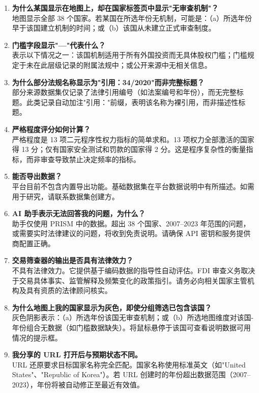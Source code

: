 \documentclass[12pt,a4paper]{article}
\begin{document}
\begin{enumerate}[label=\textbf{问\arabic*.}]

\item \textbf{为什么某国显示在地图上，却在国家标签页中显示"无审查机制"？}\\
地图显示全部 38 个国家。若某国在所选年份无机制，可能是：（a）所选年份早于该国建立机制的时间；或（b）该国从未建立正式审查制度。

\item \textbf{门槛字段显示"—"代表什么？}\\
表示以下情况之一：该国机制适用于所有外国投资而无具体股权门槛；门槛规定于未在此层级记录的附属法规中；或公开来源中无相关信息。

\item \textbf{为什么部分法规名称显示为"引用：34/2020"而非完整标题？}\\
部分来源数据集仅记录了法律引用编号（如法案编号和年份），而无完整标题。此类记录自动加注"引用："前缀，表明该名称为裸引用，而非描述性标题。

\item \textbf{严格程度评分如何计算？}\\
严格程度是 13 项二元程序性权力指标的简单求和。13 项权力全部激活的国家得 13 分；仅有国家安全测试和罚款的国家得 2 分。这是程序复杂性的衡量指标，而非审查导致禁止决定频率的指标。

\item \textbf{能否导出数据？}\\
平台目前不包含内置导出功能。基础数据集在平台数据说明中有所描述。如需用于研究，请联系数据集创建方。

\item \textbf{AI 助手表示无法回答我的问题，为什么？}\\
助手仅使用 PRISM 中的数据。超出 38 个国家、2007--2023 年范围的问题，或需要实时法律建议的问题，将收到免责说明。请确保 API 密钥和服务提供商配置正确。

\item \textbf{交易筛查器的输出是否具有法律效力？}\\
不具有法律效力。它提供基于编码数据的指导性自动评估。FDI 审查义务取决于交易具体事实、监管解释及频繁变化的政策指引。请务必向相关国家主管机构及具有资质的法律顾问核实。

\item \textbf{为什么地图上我的国家显示为灰色，即使分组筛选已包含该国？}\\
灰色阴影表示：（a）所选年份该国无审查机制；或（b）所选地图维度对该国-年份组合无数据（如门槛数据缺失）。将鼠标悬停于该国可查看说明数据可用情况的提示框。

\item \textbf{我分享的 URL 打开后与预期状态不同。}\\
URL 还原要求目标国家名称完全匹配。国家名称使用标准英文（如"United States"、"Republic of Korea"）。若 URL 创建时的年份超出数据范围（2007--2023），年份将被自动修正至最近有效值。

\end{enumerate}
\end{document}
